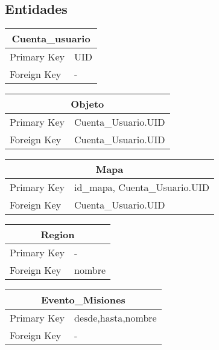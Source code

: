 \documentclass{report}
\begin{document}
\subsection{Entidades}

\begin{center}    
    \begin{tabular}{|p{3cm}|p{5cm}|}
    \hline
    \multicolumn{2}{|c|}{Cuenta_usuario} \\ 
    \hline
    \hline
    Primary Key& UID\\ 
    \hline
    Foreign Key & -\\ 
    \hline
    \end{tabular}
\end{center}

\begin{center}    
    \begin{tabular}{|p{3cm}|p{5cm}|}
    \hline
    \multicolumn{2}{|c|}{Objeto} \\ 
    \hline
    \hline
    Primary Key& Cuenta\_Usuario.UID\\ 
    \hline
    Foreign Key& Cuenta\_Usuario.UID\\ 
    \hline
    \end{tabular}
\end{center}

\begin{center}    
    \begin{tabular}{|p{3cm}|p{5cm}|}
    \hline
    \multicolumn{2}{|c|}{Mapa} \\ 
    \hline
    \hline
    Primary Key & id\_mapa, Cuenta\_Usuario.UID\\
    \hline
    Foreign Key& Cuenta\_Usuario.UID\\ 
    \hline
    \end{tabular}
\end{center}

\begin{center}    
    \begin{tabular}{|p{3cm}|p{5cm}|}
    \hline
    \multicolumn{2}{|c|}{Region} \\ 
    \hline
    \hline
    Primary Key& -\\ 
    \hline
    Foreign Key& nombre\\ 
    \hline
    \end{tabular}
\end{center}
\newpage
\begin{center}    
    \begin{tabular}{|p{3cm}|p{5cm}|}
    \multicolumn{2}{|c|}{Evento\_Misiones} \\ 
    \hline
    \hline
    Primary Key& desde,hasta,nombre\\ 
    \hline
    Foreign Key &-\\ 
    \hline
    \end{tabular}
\end{center}
\end{document}
